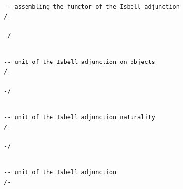 \documentclass{book}
\theoremstyle{definition}
\newcounter{lcounter}
\begin{document}
{{\begin{center}
\begin{tcolorbox}[width=5in,colback={white},title={\begin{center}\texttt{Lean \thelcounter} \addtocounter{lcounter}{1}  \end{center}},colbacktitle=Blue,coltitle=black]
\begin{verbatim}
-- assembling the functor of the Isbell adjunction
/-

-/

\end{verbatim}
\end{tcolorbox}
\end{center}

\begin{center}
\begin{tcolorbox}[width=5in,colback={white},title={\begin{center}\texttt{Lean \thelcounter} \addtocounter{lcounter}{1}  \end{center}},colbacktitle=Blue,coltitle=black]
\begin{verbatim}

-- unit of the Isbell adjunction on objects
/-

-/

\end{verbatim}
\end{tcolorbox}
\end{center}

\begin{center}
\begin{tcolorbox}[width=5in,colback={white},title={\begin{center}\texttt{Lean \thelcounter} \addtocounter{lcounter}{1}  \end{center}},colbacktitle=Blue,coltitle=black]
\begin{verbatim}

-- unit of the Isbell adjunction naturality
/-

-/

\end{verbatim}
\end{tcolorbox}
\end{center}

\begin{center}
\begin{tcolorbox}[width=5in,colback={white},title={\begin{center}\texttt{Lean \thelcounter} \addtocounter{lcounter}{1}  \end{center}},colbacktitle=Blue,coltitle=black]
\begin{verbatim}

-- unit of the Isbell adjunction
/-


\end{verbatim}
\end{tcolorbox}
\end{center}}}
\end{document}
